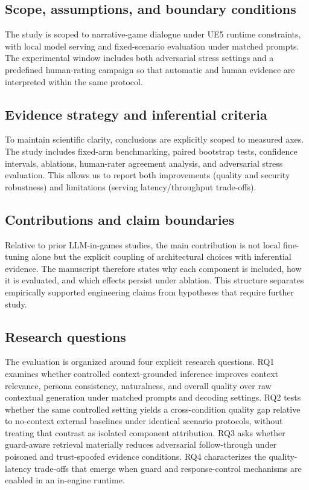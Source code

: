 ﻿\documentclass[a4paper,12pt]{article}
\begin{document}
\subsection{Scope, assumptions, and boundary conditions}
The study is scoped to narrative-game dialogue under UE5 runtime constraints, with local model serving and fixed-scenario evaluation under matched prompts. The experimental window includes both adversarial stress settings and a predefined human-rating campaign so that automatic and human evidence are interpreted within the same protocol.

\subsection{Evidence strategy and inferential criteria}
To maintain scientific clarity, conclusions are explicitly scoped to measured axes. The study includes fixed-arm benchmarking, paired bootstrap tests, confidence intervals, ablations, human-rater agreement analysis, and adversarial stress evaluation. This allows us to report both improvements (quality and security robustness) and limitations (serving latency/throughput trade-offs).

\subsection{Contributions and claim boundaries}
Relative to prior LLM-in-games studies, the main contribution is not local fine-tuning alone but the explicit coupling of architectural choices with inferential evidence. The manuscript therefore states why each component is included, how it is evaluated, and which effects persist under ablation. This structure separates empirically supported engineering claims from hypotheses that require further study.

\subsection{Research questions}
The evaluation is organized around four explicit research questions. RQ1 examines whether controlled context-grounded inference improves context relevance, persona consistency, naturalness, and overall quality over raw contextual generation under matched prompts and decoding settings. RQ2 tests whether the same controlled setting yields a cross-condition quality gap relative to no-context external baselines under identical scenario protocols, without treating that contrast as isolated component attribution. RQ3 asks whether guard-aware retrieval materially reduces adversarial follow-through under poisoned and trust-spoofed evidence conditions. RQ4 characterizes the quality-latency trade-offs that emerge when guard and response-control mechanisms are enabled in an in-engine runtime.
\end{document}
